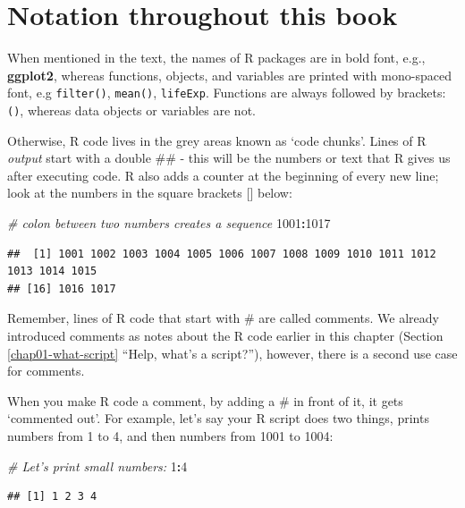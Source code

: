 \documentclass[
  12pt,
  krantz2]{krantz}
\makeatletter
\newenvironment{Shaded}{\begin{snugshade}}{\end{snugshade}}
\newcommand{\CommentTok}[1]{\textcolor[rgb]{0.56,0.35,0.01}{\textit{#1}}}
\newcommand{\DecValTok}[1]{\textcolor[rgb]{0.00,0.00,0.81}{#1}}
\newcommand{\OperatorTok}[1]{\textcolor[rgb]{0.81,0.36,0.00}{\textbf{#1}}}
\newenvironment{kframe}{%
\medskip{}
\setlength{\fboxsep}{.8em}
 \def\at@end@of@kframe{}%
 \ifinner\ifhmode%
  \def\at@end@of@kframe{\end{minipage}}%
  \begin{minipage}{\columnwidth}%
 \fi\fi%
 \def\FrameCommand##1{\hskip\@totalleftmargin \hskip-\fboxsep
 \colorbox{shadecolor}{##1}\hskip-\fboxsep
     \hskip-\linewidth \hskip-\@totalleftmargin \hskip\columnwidth}%
 \MakeFramed {\advance\hsize-\width
   \@totalleftmargin\z@ \linewidth\hsize
   \@setminipage}}%
 {\par\unskip\endMakeFramed%
 \at@end@of@kframe}
\renewenvironment{Shaded}{\begin{kframe}}{\end{kframe}}
\makeatother
\begin{document}
\hypertarget{notation-throughout-this-book}{%
\section{Notation throughout this book}\label{notation-throughout-this-book}}

When mentioned in the text, the names of R packages are in bold font, e.g., \textbf{ggplot2}, whereas functions, objects, and variables are printed with mono-spaced font, e.g \texttt{filter()}, \texttt{mean()}, \texttt{lifeExp}. Functions are always followed by brackets: \texttt{()}, whereas data objects or variables are not.

Otherwise, R code lives in the grey areas known as `code chunks'.
Lines of R \emph{output} start with a double \#\# - this will be the numbers or text that R gives us after executing code.
R also adds a counter at the beginning of every new line; look at the numbers in the square brackets {[}{]} below:

\begin{Shaded}
\begin{Highlighting}[]
\CommentTok{# colon between two numbers creates a sequence}
\DecValTok{1001}\OperatorTok{:}\DecValTok{1017}
\end{Highlighting}
\end{Shaded}

\begin{verbatim}
##  [1] 1001 1002 1003 1004 1005 1006 1007 1008 1009 1010 1011 1012 1013 1014 1015
## [16] 1016 1017
\end{verbatim}

Remember, lines of R code that start with \# are called comments.
We already introduced comments as notes about the R code earlier in this chapter (Section \ref{chap01-what-script} ``Help, what's a script?''), however, there is a second use case for comments.

When you make R code a comment, by adding a \# in front of it, it gets `commented out'.
For example, let's say your R script does two things, prints numbers from 1 to 4, and then numbers from 1001 to 1004:

\begin{Shaded}
\begin{Highlighting}[]
\CommentTok{# Let's print small numbers:}
\DecValTok{1}\OperatorTok{:}\DecValTok{4}
\end{Highlighting}
\end{Shaded}

\begin{verbatim}
## [1] 1 2 3 4
\end{verbatim}
\end{document}
